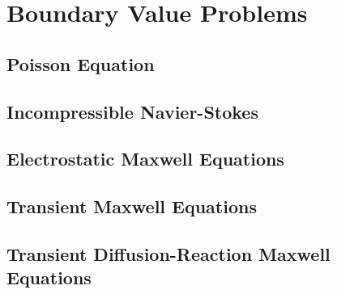 \documentclass[../Dissertation]{subfiles}
\begin{document}
\section{Boundary Value Problems}\label{sec:impact}
    \lipsum[1]
    \subsection{Poisson Equation}
    \lipsum[1]
    \subsection{Incompressible Navier-Stokes}
    \lipsum[1]
    \subsection{Electrostatic Maxwell Equations}
    \lipsum[1]
    \subsection{Transient Maxwell Equations}
    \lipsum[1]
    \subsection{Transient Diffusion-Reaction Maxwell Equations}
    \lipsum[1]
    
\end{document}
